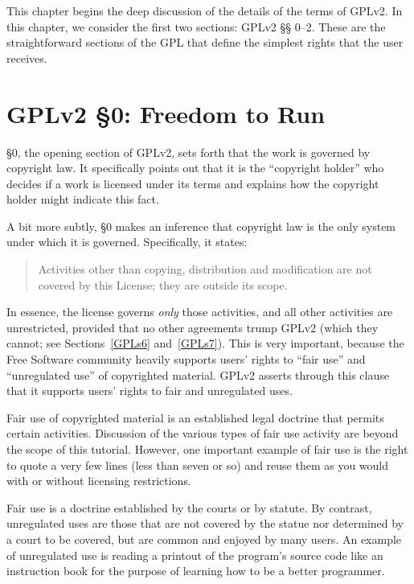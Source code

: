 This chapter begins the deep discussion of the details of the terms of
GPLv2\@. In this chapter, we consider the first two sections: GPLv2 \S\S
0--2. These are the straightforward sections of the GPL that define the
simplest rights that the user receives.

\section{GPLv2 \S 0: Freedom to Run}
\label{GPLs0}

\S 0, the opening section of GPLv2, sets forth that the work is governed by
copyright law. It specifically points out that it is the ``copyright
holder'' who decides if a work is licensed under its terms and explains
how the copyright holder might indicate this fact.

A bit more subtly, \S 0 makes an inference that copyright law is the only
system under which it is governed. Specifically, it states:
\begin{quote}
Activities other than copying, distribution and modification are not
covered by this License; they are outside its scope.
\end{quote}
In essence, the license governs \emph{only} those activities, and all other
activities are unrestricted, provided that no other agreements trump GPLv2
(which they cannot; see Sections~\ref{GPLs6} and~\ref{GPLs7}). This is
very important, because the Free Software community heavily supports
users' rights to ``fair use'' and ``unregulated use'' of copyrighted
material. GPLv2 asserts through this clause that it supports users' rights
to fair and unregulated uses.

Fair use of copyrighted material is an established legal doctrine that
permits certain activities. Discussion of the various types of fair
use activity are beyond the scope of this tutorial. However, one
important example of fair use is the right to quote a very few lines
(less than seven or so) and reuse them as you would with or without
licensing restrictions.

Fair use is a doctrine established by the courts or by statute. By
contrast, unregulated uses are those that are not covered by the statue
nor determined by a court to be covered, but are common and enjoyed by
many users. An example of unregulated use is reading a printout of the
program's source code like an instruction book for the purpose of learning
how to be a better programmer.

\medskip

